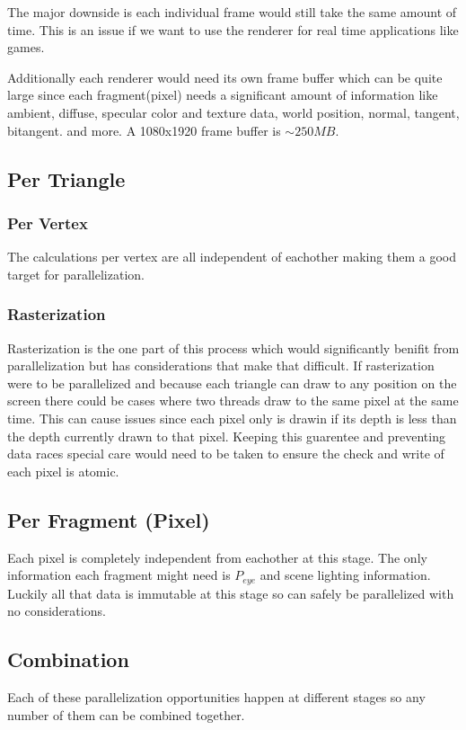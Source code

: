 \documentclass[12pt]{article}
\begin{document}
The major downside is each individual frame would still take the same amount of time. This is an issue if we want to use the renderer for real time applications like games.

Additionally each renderer would need its own frame buffer which can be quite large since each fragment(pixel) needs a significant amount of information like ambient, diffuse, specular color and texture data, world position, normal, tangent, bitangent. and more. A 1080x1920 frame buffer is $\sim 250MB$.

\subsection{Per Triangle}
\subsubsection{Per Vertex}
The calculations per vertex are all independent of eachother making them a good target for parallelization.

\subsubsection{Rasterization}
Rasterization is the one part of this process which would significantly benifit from parallelization but has considerations that make that difficult. If rasterization were to be parallelized and because each triangle can draw to any position on the screen there could be cases where two threads draw to the same pixel at the same time. This can cause issues since each pixel only is drawin if its depth is less than the depth currently drawn to that pixel. Keeping this guarentee and preventing data races special care would need to be taken to ensure the check and write of each pixel is atomic.

\subsection{Per Fragment (Pixel)}
Each pixel is completely independent from eachother at this stage. The only information each fragment might need is $P_{eye}$ and scene lighting information. Luckily all that data is immutable at this stage so can safely be parallelized with no considerations.

\subsection{Combination}
Each of these parallelization opportunities happen at different stages so any number of them can be combined together.
\end{document}
